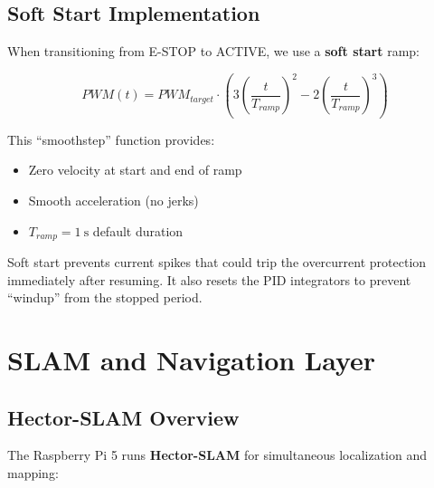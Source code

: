 \documentclass[11pt,letterpaper]{article}
\begin{document}
\subsection{Soft Start Implementation}

When transitioning from E-STOP to ACTIVE, we use a \textbf{soft start} ramp:

\begin{equation}
PWM(t) = PWM_{target} \cdot \left(3\left(\frac{t}{T_{ramp}}\right)^2 - 2\left(\frac{t}{T_{ramp}}\right)^3\right)
\end{equation}

This ``smoothstep'' function provides:
\begin{itemize}
    \item Zero velocity at start and end of ramp
    \item Smooth acceleration (no jerks)
    \item $T_{ramp} = \SI{1}{\second}$ default duration
\end{itemize}

\begin{whymatters}
Soft start prevents current spikes that could trip the overcurrent protection immediately after resuming. It also resets the PID integrators to prevent ``windup'' from the stopped period.
\end{whymatters}

\newpage
\section{SLAM and Navigation Layer}

\subsection{Hector-SLAM Overview}

The Raspberry Pi 5 runs \textbf{Hector-SLAM} for simultaneous localization and mapping:

\begin{center}
\end{center}
\end{document}
